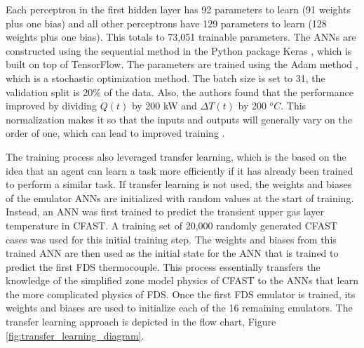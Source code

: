 \documentclass{article}
\begin{document}
Each perceptron in the first hidden layer has 92 parameters to learn (91 weights plus one bias) and all other perceptrons have 129 parameters to learn (128 weights plus one bias). This totals to 73,051 trainable parameters. The ANNs are constructed using the sequential method in the Python package Keras \cite{chollet2018keras}, which is built on top of TensorFlow. The parameters are trained using the Adam method \cite{kingma2014adam}, which is a stochastic optimization method. The batch size is set to 31, the validation split is  20\% of the data. Also, the authors found that the performance improved by dividing $\dot{Q}(t)$ by 200 kW and $\Delta T(t)$ by 200 $^oC$. This normalization makes it so that the inputs and outputs will generally vary on the order of one, which can lead to improved training \cite{sola1997importance}. 

The training process also leveraged transfer learning, which is the based on the idea that an agent can learn a task more efficiently if it has already been trained to perform a similar task. If transfer learning is not used, the weights and biases of the emulator ANNs are initialized with random values at the start of training. Instead, an ANN was first trained to predict the transient upper gas layer temperature in CFAST. A training set of 20,000 randomly generated CFAST cases was used for this initial training step. The weights and biases from this trained ANN are then used as the initial state for the ANN that is trained to predict the first FDS thermocouple. This process essentially transfers the knowledge of the simplified zone model physics of CFAST to the ANNs that learn the more complicated physics of FDS. Once the first FDS emulator is trained, its weights and biases are used to initialize each of the 16 remaining emulators. The transfer learning approach is depicted in the flow chart, Figure \ref{fig:transfer_learning_diagram}.
\end{document}
